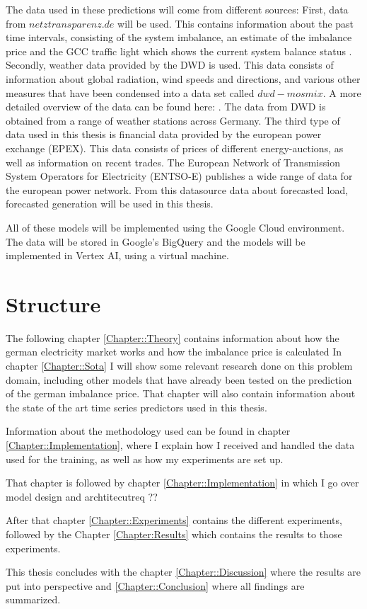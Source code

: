 \documentclass[class=scrbook, crop=false]{standalone}
\begin{document}
The data used in these predictions will come from different sources: First, data from $netztransparenz.de$ will be used. This contains information about the past time intervals, consisting of the system imbalance, an estimate of the imbalance price and the GCC traffic light which shows the current system balance status \cite{trafficlight}. Secondly, weather data provided by the DWD is used. This data consists of information about global radiation, wind speeds and directions, and various other measures that have been condensed into a data set called $dwd-mosmix$. A more detailed overview of the data can be found here: \cite{dwdmosmix}. The data from DWD is obtained from a range of weather stations across Germany. The third type of data used in this thesis is financial data provided by the european power exchange (EPEX). This data consists of prices of different energy-auctions, as well as information on recent trades.
The European Network of Transmission System Operators for Electricity (ENTSO-E) publishes a wide range of data for the european power network. From this datasource data about forecasted load, forecasted generation will be used in this thesis. 

All of these models will be implemented using the Google Cloud environment. The data will be stored in Google's BigQuery and the models will be implemented in Vertex AI, using a virtual machine.

\section{Structure}
\label{Section::Structure}
The following chapter \ref{Chapter::Theory} contains information about how the german electricity market works and how the imbalance price is calculated
In chapter \ref{Chapter::Sota} I will show some relevant research done on this problem domain, including other models that have already been tested on the prediction of the german imbalance price. 
That chapter will also contain information about the state of the art time series predictors used in this thesis.

Information about the methodology used can be found in chapter \ref{Chapter::Implementation}, where I explain how I received and handled the data used for the training, as well as how my experiments are set up.

That chapter is followed by chapter \ref{Chapter::Implementation} in which I go over model design and archtitecutreq ??

After that chapter \ref{Chapter::Experiments} contains the different experiments, followed by the Chapter \ref{Chapter:Results} which contains the results to those experiments.

This thesis concludes with the chapter \ref{Chapter::Discussion} where the results are put into perspective and \ref{Chapter::Conclusion} where all findings are summarized.

\ifstandalone
    \printglossary
    \printbibliography[heading=bibintoc]
\fi
\end{document}
